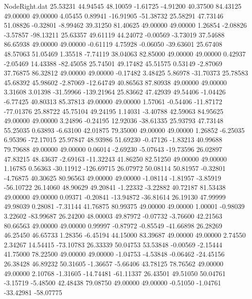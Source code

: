 \begin{filecontents}{NodeRight.dat}
  25.53231   44.94545   48.10059    -1.61725   -4.91200   40.37500   84.43125   49.00000   49.00000    4.05455    0.89941  -16.91905  -51.38732
  25.58291   47.73146   51.08826    -0.32801   -8.99462   39.31250   81.40625   49.00000   49.00000    1.26854   -2.08826   -3.57857  -98.13211
  25.63357   49.61119   44.24072    -0.00569   -3.73019   37.54688   86.65938   49.00000   49.00000   -0.61119    4.75928   -0.06050  -39.63601
  25.67408   48.57063   51.05469     1.35518   -7.74119   38.04063   82.85000   49.00000   49.00000    0.42937   -2.05469   14.43388  -82.45058
  25.74501   49.17482   45.51575     0.53149   -2.87069   37.76875   86.32812   49.00000   49.00000   -0.17482    3.48425    5.86978  -31.70373
  25.78583   45.68392   45.98602    -2.87069  -12.64749   40.86563   87.80938   49.00000   49.00000    3.31608    3.01398  -31.59966 -139.21964
  25.83662   47.42939   49.54406    -1.04426   -6.77425   40.80313   85.37813   49.00000   49.00000    1.57061   -0.54406  -11.87172  -77.01376
  25.88722   45.75104   49.24195     1.14031   -3.40788   42.59063   84.95625   49.00000   49.00000    3.24896   -0.24195   12.92036  -38.61335
  25.93793   47.73148   55.25035     0.63893   -6.63100   42.01875   79.35000   49.00000   49.00000    1.26852   -6.25035    6.95396  -72.17015
  25.97847   48.93986   51.69230    -0.47126   -1.83213   40.99688   79.79688   49.00000   49.00000    0.06014   -2.69230   -5.07643  -19.73596
  26.02897   47.83215   48.43637    -2.69163  -11.32243   41.86250   82.51250   49.00000   49.00000    1.16785    0.56363  -30.11912 -126.69715
  26.07972   50.08114   50.81957    -0.32801   -4.76875   40.30625   80.96563   49.00000   49.00000   -1.08114   -1.81957   -3.85919  -56.10722
  26.14060   48.90629   49.20841    -1.22332   -3.22882   40.72187   81.53438   49.00000   49.00000    0.09371   -0.20841  -13.94872  -36.81614
  26.19130   47.99999   49.98039     0.28081   -7.31144   41.76875   80.99375   49.00000   49.00000    1.00001   -0.98039    3.22602  -83.99687
  26.24200   48.00003   49.87972    -0.07732   -3.76600   42.21563   80.66563   49.00000   49.00000    0.99997   -0.87972   -0.85549  -41.66898
  26.28269   46.25450   46.65733     1.28356   -6.45194   44.15000   83.39687   49.00000   49.00000    2.74550    2.34267   14.54415  -73.10783
  26.33339   50.04753   53.53848    -0.00569   -2.15444   41.75000   78.22500   49.00000   49.00000   -1.04753   -4.53848   -0.06462  -24.45156
  26.38428   46.89232   50.31605    -1.36657   -5.66406   43.78125   78.76562   49.00000   49.00000    2.10768   -1.31605  -14.74481  -61.11337
  26.43501   49.51050   50.04761    -3.15719   -5.48500   42.48438   79.08750   49.00000   49.00000   -0.51050   -1.04761  -33.42981  -58.07775

\end{filecontents}
